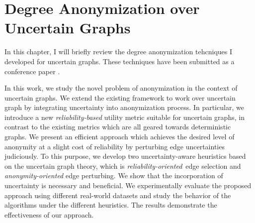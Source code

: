 \chapter{Degree Anonymization over Uncertain Graphs}
\label{chp:d}
In this chapter, I will briefly review the degree anonymization tehcniques I developed for uncertain graphs. These techniques have been submitted as a conference paper \cite{}.

In this work, we study the novel problem of anonymization in the context of uncertain graphs. We extend the existing framework to work over uncertain graph by integrating uncertainty into anonymization process. In particular, we introduce a new {\em reliability-based} utility metric suitable for uncertain graphs, in contrast to the existing metrics which are all geared towards deterministic graphs. We present an efficient approach which achieves the desired level of anonymity at a slight cost of reliability by perturbing edge uncertainties judiciously.  To this purpose, we develop two uncertainty-aware heuristics based on the uncertain graph theory, which is {\em reliability-oriented}~edge selection and {\em anonymity-oriented} edge perturbing.  We show that the incorporation of uncertainty is necessary and beneficial. We experimentally evaluate the proposed approach using different real-world datasets and study the behavior of the algorithms under the different heuristics.  The results demonstrate the effectiveness of our approach. 




